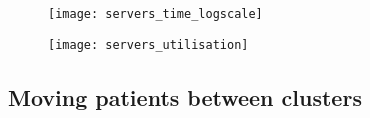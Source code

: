 \begin{figure}
    \centering
    \begin{minipage}{\halfimgwidth}
        \texttt{[image: servers\_time\_logscale]}
        \label{fig:servers_time}
    \end{minipage}\hfill%
    \begin{minipage}{\halfimgwidth}
        \texttt{[image: servers\_utilisation]}
        \label{fig:servers_utilisation}
    \end{minipage}
\end{figure}


\subsection{Moving patients between clusters}\label{subsec:moving}

